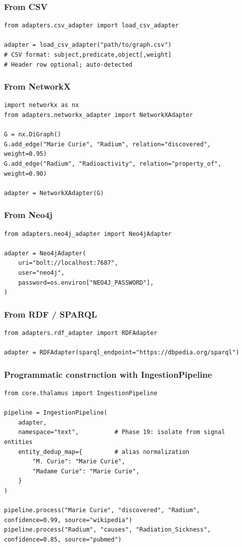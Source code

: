 \documentclass[11pt,article,oneside]{memoir}
\begin{document}
\subsubsection{From CSV}
\begin{lstlisting}
from adapters.csv_adapter import load_csv_adapter

adapter = load_csv_adapter("path/to/graph.csv")
# CSV format: subject,predicate,object[,weight]
# Header row optional; auto-detected
\end{lstlisting}

\subsubsection{From NetworkX}
\begin{lstlisting}
import networkx as nx
from adapters.networkx_adapter import NetworkXAdapter

G = nx.DiGraph()
G.add_edge("Marie Curie", "Radium", relation="discovered", weight=0.95)
G.add_edge("Radium", "Radioactivity", relation="property_of", weight=0.90)

adapter = NetworkXAdapter(G)
\end{lstlisting}

\subsubsection{From Neo4j}
\begin{lstlisting}
from adapters.neo4j_adapter import Neo4jAdapter

adapter = Neo4jAdapter(
    uri="bolt://localhost:7687",
    user="neo4j",
    password=os.environ["NEO4J_PASSWORD"],
)
\end{lstlisting}

\subsubsection{From RDF / SPARQL}
\begin{lstlisting}
from adapters.rdf_adapter import RDFAdapter

adapter = RDFAdapter(sparql_endpoint="https://dbpedia.org/sparql")
\end{lstlisting}

\subsubsection{Progra\-mmatic const\-ruction with IngestionPipeline}
\begin{lstlisting}
from core.thalamus import IngestionPipeline

pipeline = IngestionPipeline(
    adapter,
    namespace="text",          # Phase 19: isolate from signal entities
    entity_dedup_map={         # alias normalization
        "M. Curie": "Marie Curie",
        "Madame Curie": "Marie Curie",
    }
)

pipeline.process("Marie Curie", "discovered", "Radium", confidence=0.99, source="wikipedia")
pipeline.process("Radium", "causes", "Radiation_Sickness", confidence=0.85, source="pubmed")
\end{lstlisting}
\end{document}
